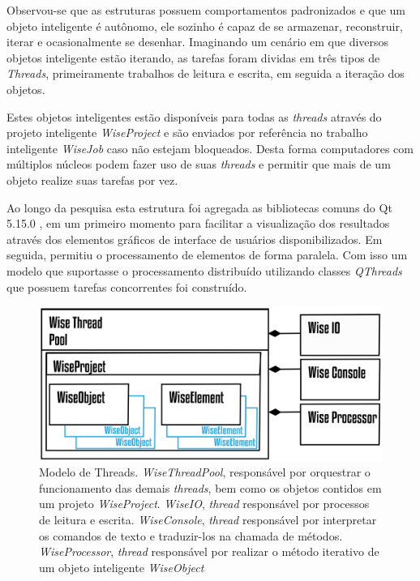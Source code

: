 Observou-se que as estruturas possuem comportamentos padronizados e que um objeto inteligente é autônomo, ele sozinho é capaz de se armazenar, reconstruir, iterar e ocasionalmente se desenhar. Imaginando um cenário em que diversos objetos inteligente estão iterando, as tarefas foram dividas em três tipos de \textit{Threads}, primeiramente trabalhos de leitura e escrita, em seguida a iteração dos objetos. 

Estes objetos inteligentes estão disponíveis para todas as \textit{threads} através do projeto inteligente \textit{WiseProject} e são enviados por referência no trabalho inteligente \textit{WiseJob} caso não estejam bloqueados. Desta forma computadores com múltiplos núcleos podem fazer uso de suas \textit{threads} e permitir que mais de um objeto realize suas tarefas por vez.

Ao longo da pesquisa esta estrutura foi agregada as bibliotecas comuns do Qt 5.15.0 \cite{QTClasses}, em um primeiro momento para facilitar a visualização dos resultados através dos elementos gráficos de interface de usuários disponibilizados. Em seguida, permitiu o processamento de elementos de forma paralela. Com isso um modelo que suportasse o processamento distribuído utilizando classes \textit{QThreads} que possuem tarefas concorrentes foi construído.


\begin{figure}[!htbp]
	\centering
	\includegraphics[width=\linewidth]{Figures/WiseThreadPool@16x.png}
	\caption{Modelo de Threads. \textit{WiseThreadPool}, responsável por orquestrar o funcionamento das demais \textit{threads}, bem como os objetos contidos em um projeto \textit{WiseProject}. \textit{WiseIO}, \textit{thread} responsável por processos de leitura e escrita. \textit{WiseConsole}, \textit{thread} responsável por interpretar os comandos de texto e traduzir-los na chamada de métodos. \textit{WiseProcessor}, \textit{thread} responsável por realizar o método iterativo de um objeto inteligente \textit{WiseObject}}
	\label{fig7:threads}
\end{figure}

